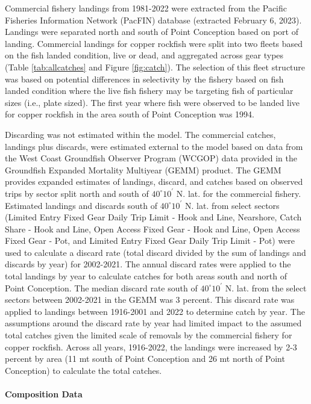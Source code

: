 \documentclass[11pt,
  english,
  letterpaper,
]{article}
\begin{document}
Commercial fishery landings from 1981-2022 were extracted from the Pacific Fisheries Information Network (PacFIN) database (extracted February 6, 2023). Landings were separated north and south of Point Conception based on port of landing. Commercial landings for copper rockfish were split into two fleets based on the fish landed condition, live or dead, and aggregated across gear types (Table \ref{tab:allcatches} and Figure \ref{fig:catch}). The selection of this fleet structure was based on potential differences in selectivity by the fishery based on fish landed condition where the live fish fishery may be targeting fish of particular sizes (i.e., plate sized). The first year where fish were observed to be landed live for copper rockfish in the area south of Point Conception was 1994.

Discarding was not estimated within the model. The commercial catches, landings plus discards, were estimated external to the model based on data from the West Coast Groundfish Observer Program (WCGOP) data provided in the Groundfish Expanded Mortality Multiyear (GEMM) product. The GEMM provides expanded estimates of landings, discard, and catches based on observed trips by sector split north and south of $40^\circ 10^\prime$ N. lat. for the commercial fishery. Estimated landings and discards south of $40^\circ 10^\prime$ N. lat. from select sectors (Limited Entry Fixed Gear Daily Trip Limit - Hook and Line, Nearshore, Catch Share - Hook and Line, Open Access Fixed Gear - Hook and Line, Open Access Fixed Gear - Pot, and Limited Entry Fixed Gear Daily Trip Limit - Pot) were used to calculate a discard rate (total discard divided by the sum of landings and discards by year) for 2002-2021. The annual discard rates were applied to the total landings by year to calculate catches for both areas south and north of Point Conception. The median discard rate south of $40^\circ 10^\prime$ N. lat. from the select sectors between 2002-2021 in the GEMM was 3 percent. This discard rate was applied to landings between 1916-2001 and 2022 to determine catch by year. The assumptions around the discard rate by year had limited impact to the assumed total catches given the limited scale of removals by the commercial fishery for copper rockfish. Across all years, 1916-2022, the landings were increased by 2-3 percent by area (11 mt south of Point Conception and 26 mt north of Point Conception) to calculate the total catches.

\hypertarget{composition-data}{%
\paragraph{Composition Data}\label{composition-data}}
\end{document}
